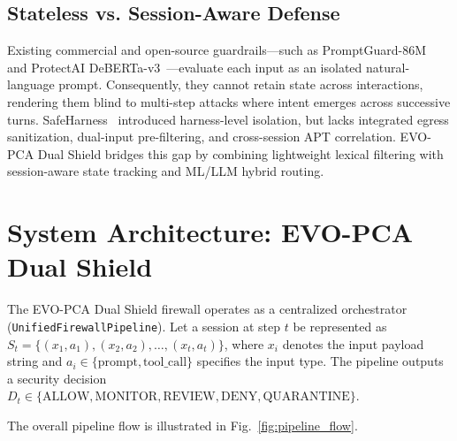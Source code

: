 \documentclass[runningheads]{llncs}
\begin{document}
\subsection{Stateless vs. Session-Aware Defense}
Existing commercial and open-source guardrails---such as PromptGuard-86M~\cite{llamafirewall2024} and ProtectAI DeBERTa-v3~\cite{protectai2024}---evaluate each input as an isolated natural-language prompt. Consequently, they cannot retain state across interactions, rendering them blind to multi-step attacks where intent emerges across successive turns. SafeHarness~\cite{liu2024safeharness} introduced harness-level isolation, but lacks integrated egress sanitization, dual-input pre-filtering, and cross-session APT correlation. EVO-PCA Dual Shield bridges this gap by combining lightweight lexical filtering with session-aware state tracking and ML/LLM hybrid routing.

\section{System Architecture: EVO-PCA Dual Shield}
The EVO-PCA Dual Shield firewall operates as a centralized orchestrator (\texttt{Unified\allowbreak Firewall\allowbreak Pipeline}). Let a session at step $t$ be represented as $S_t = \{(x_1, a_1), (x_2, a_2), \dots, (x_t, a_t)\}$, where $x_i$ denotes the input payload string and $a_i \in \{\text{prompt}, \text{tool\_call}\}$ specifies the input type. The pipeline outputs a security decision $D_t \in \{\text{ALLOW}, \text{MONITOR}, \text{REVIEW}, \text{DENY}, \text{QUARANTINE}\}$.

The overall pipeline flow is illustrated in Fig.~\ref{fig:pipeline_flow}.
\end{document}
